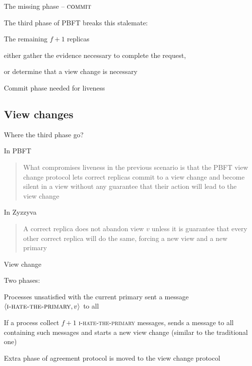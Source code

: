\begin{frame}{The missing phase -- $\textsc{commit}$}
	
The third phase of PBFT breaks this stalemate:
\BIL
\item The remaining $f+1$ replicas 
\BI
\item either gather the evidence necessary to complete the request,
\item or determine that a view change is necessary
\EI	
\item Commit phase needed for liveness
\EIL
	
\end{frame}

\subsection{View changes}

\begin{frame}{Where the third phase go?}
	
\begin{block}{In PBFT}
\begin{quote}	
What compromises liveness in the previous scenario is that the PBFT view
change protocol lets correct replicas commit to a view change and become
silent in a view without any guarantee that their action will lead to the view
change
\end{quote}
\end{block}

\begin{block}{In Zyzzyva}
\begin{quote}	
A correct replica does not abandon view $v$ unless it is guarantee that every
other correct replica will do the same, forcing a new view and a new primary
\end{quote}
\end{block}

\end{frame}

\begin{frame}{View change}
	
\BIL
\item Two phases:
\BI
\item Processes unsatisfied with the current primary sent a message
$\langle \textsc{i-hate-the-primary}, v \rangle$ to all
\item If a process collect $f+1$ \textsc{i-hate-the-primary} messages,
sends a message to all containing such messages and starts a new view
change (similar to the traditional one)
\EI
\item Extra phase of agreement protocol is moved to the view change protocol
\EIL
	
\end{frame}	


